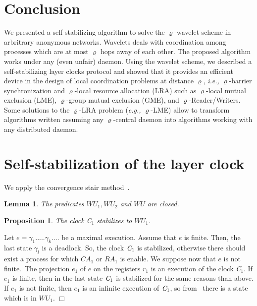 \documentclass[11pt]{article}
\newenvironment{proof}{{\bf Proof. } }{{\hfill $\Box$}\vspace{.5pc}}
\newtheorem{lemma}[theorem]{Lemma}
\newtheorem{proposition}[theorem]{Proposition}
\newcommand{\eg}{\emph{e.g., }}
\newcommand{\ie}{\emph{i.e., }}
\begin{document}
\section{Conclusion}
\label{sec:conclusion}
We presented a self-stabilizing algorithm to solve the $\varrho$-wavelet scheme in arbritrary anonymous networks. 
Wavelets deals with coordination among processes which are at most $\varrho$ hops away of each other.  
The proposed algorithm works under any (even unfair) daemon. 
Using the wavelet scheme, we described a self-stabilizing layer clocks protocol and 
showed that it provides an efficient device in the design of local coordination 
problems at distance $\varrho$, \ie $\varrho$-barrier synchronization and
$\varrho$-local resource allocation (LRA) such as $\varrho$-local mutual exclusion (LME), 
$\varrho$-group mutual exclusion (GME), and $\varrho$-Reader/Writers.  Some solutions to 
the $\varrho$-LRA problem (\eg $\varrho$-LME) allow 
to transform algorithms written assuming any $\varrho$-central daemon into algorithms working 
with any distributed daemon.  

\singlespacing



\begin{small}

\end{small}

\newpage

\appendix

\section{Self-stabilization of the layer clock}
We apply the convergence stair method~\cite{D00}.\begin{lemma}
The predicates $WU_{1},WU_{2}$ and $WU$ are closed.
\end{lemma}

\begin{proposition}
\label{pro:dc_1 }
The clock \emph{C}$_{1}$ stabilizes to $WU_{1}$.
\end{proposition}

\begin{proof}
Let $e=\gamma _{1}.....\gamma _{k}....$ be a maximal execution. Assume that $e$
is finite. Then, the last state $\gamma _{l}$ is a deadlock.  So, the clock $\emph{C}_{1}$ is stabilized, otherwise there should exist a process for which $CA_{1}
$ or $RA_{1}$ is enable. We suppose now that $e$ is not finite.\ The
projection $e_{1}$ of $e$ on the registers $r_{1}$ is an execution of the
clock \emph{C}$_{1}$. If $e_{1}$ is finite, then in the last state $\emph{C}_{1}$ is stabilized for the same reasons than above. If $e_{1}$ is not
finite, then $e_{1}$ is an infinite execution of $\emph{C}_{1}$, so from~\cite{BPV04b} there is a state which is in $WU_{1}$.
\end{proof}
\end{document}
